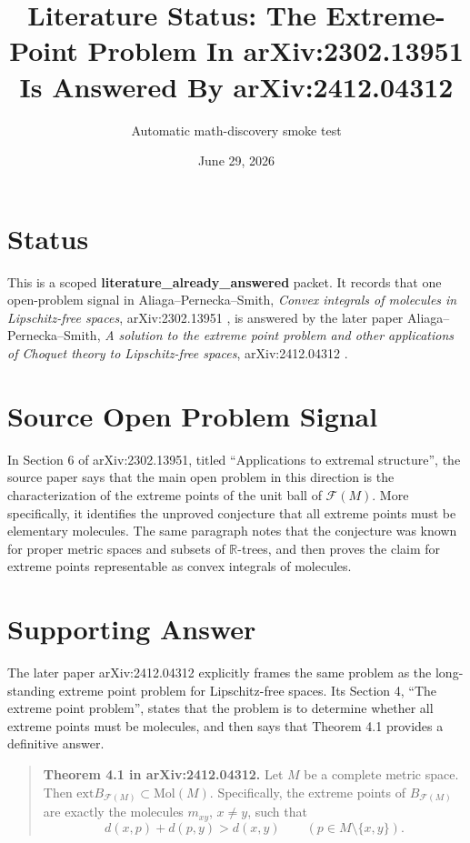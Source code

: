 \documentclass[11pt]{article}
\title{Literature Status: The Extreme-Point Problem In arXiv:2302.13951 Is Answered By arXiv:2412.04312}
\author{Automatic math-discovery smoke test}
\date{June 29, 2026}
\newcommand{\F}{\mathcal{F}}
\newcommand{\Mol}{\mathrm{Mol}}
\newcommand{\ext}{\mathrm{ext}}
\begin{document}
\maketitle

\section*{Status}

This is a scoped \textbf{literature\_already\_answered} packet.  It records
that one open-problem signal in Aliaga--Pernecka--Smith,
\emph{Convex integrals of molecules in Lipschitz-free spaces},
arXiv:2302.13951 \cite{APS2023}, is answered by the later paper
Aliaga--Pernecka--Smith, \emph{A solution to the extreme point problem and
other applications of Choquet theory to Lipschitz-free spaces},
arXiv:2412.04312 \cite{APS2024}.

\section*{Source Open Problem Signal}

In Section 6 of arXiv:2302.13951, titled ``Applications to extremal
structure'', the source paper says that the main open problem in this direction
is the characterization of the extreme points of the unit ball of
\(\F(M)\).  More specifically, it identifies the unproved conjecture that all
extreme points must be elementary molecules.  The same paragraph notes that the
conjecture was known for proper metric spaces and subsets of \(\mathbb{R}\)-trees,
and then proves the claim for extreme points representable as convex integrals
of molecules.

\section*{Supporting Answer}

The later paper arXiv:2412.04312 explicitly frames the same problem as the
long-standing extreme point problem for Lipschitz-free spaces.  Its Section 4,
``The extreme point problem'', states that the problem is to determine whether
all extreme points must be molecules, and then says that Theorem
4.1 provides a definitive answer.

\begin{quote}
\textbf{Theorem 4.1 in arXiv:2412.04312.}
Let \(M\) be a complete metric space. Then
\(\ext B_{\F(M)}\subset \Mol(M)\). Specifically, the extreme points of
\(B_{\F(M)}\) are exactly the molecules \(m_{xy}\), \(x\ne y\), such that
\[
  d(x,p)+d(p,y)>d(x,y)
  \qquad(p\in M\setminus\{x,y\}).
\]
\end{quote}
\end{document}
